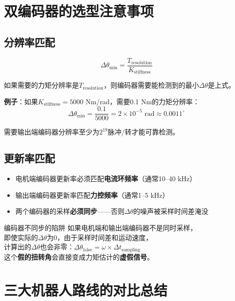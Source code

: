 \section{双编码器的选型注意事项}

\subsection{分辨率匹配}

\begin{equation}
\Delta\theta_{\text{min}} = \frac{T_{\text{resolution}}}{K_{\text{stiffness}}}
\end{equation}

如果需要的力矩分辨率是$T_{\text{resolution}}$，则编码器需要能检测到的最小$\Delta\theta$是上式。

\textbf{例子}：如果$K_{\text{stiffness}} = 5000$ Nm/rad，需要0.1 Nm的力矩分辨率：
\begin{equation}
\Delta\theta_{\text{min}} = \frac{0.1}{5000} = 2 \times 10^{-5} \text{ rad} \approx 0.0011^\circ
\end{equation}

需要输出端编码器分辨率至少为$2^{19}$脉冲/转才能可靠检测。

\subsection{更新率匹配}

\begin{itemize}
  \item 电机端编码器更新率必须匹配\textbf{电流环频率}（通常10--40 kHz）
  \item 输出端编码器更新率匹配\textbf{力控频率}（通常1--5 kHz）
  \item 两个编码器的采样\textbf{必须同步}——否则$\Delta\theta$的噪声被采样时间差淹没
\end{itemize}

\begin{cautionbox}{编码器不同步的陷阱}
如果电机端和输出端编码器不是同时采样，\\
即使实际的$\Delta\theta$为0，由于采样时间差和运动速度，\\
计算出的$\Delta\theta$也会非零：$\Delta\theta_{\text{false}} = \omega \times \Delta t_{\text{sampling}}$\\
这个\textbf{假的扭转角}会直接变成力矩估计的\textbf{虚假信号}。
\end{cautionbox}

\section{三大机器人路线的对比总结}

